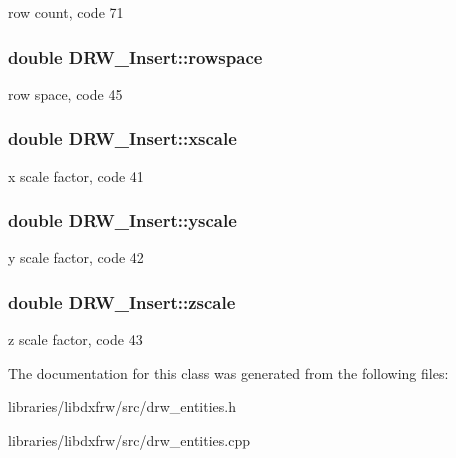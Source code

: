 row count, code 71 \hypertarget{classDRW__Insert_af9dde2e71b5fc348b0018c0e5c74d9cf}{
\subsubsection[{rowspace}]{\setlength{\rightskip}{0pt plus 5cm}double D\-R\-W\-\_\-\-Insert\-::rowspace}}\label{classDRW__Insert_af9dde2e71b5fc348b0018c0e5c74d9cf}
row space, code 45 \hypertarget{classDRW__Insert_a7b9b914c2570967914074f374ddbe9ef}{
\subsubsection[{xscale}]{\setlength{\rightskip}{0pt plus 5cm}double D\-R\-W\-\_\-\-Insert\-::xscale}}\label{classDRW__Insert_a7b9b914c2570967914074f374ddbe9ef}
x scale factor, code 41 \hypertarget{classDRW__Insert_a412f380485be38075b05976337102a47}{
\subsubsection[{yscale}]{\setlength{\rightskip}{0pt plus 5cm}double D\-R\-W\-\_\-\-Insert\-::yscale}}\label{classDRW__Insert_a412f380485be38075b05976337102a47}
y scale factor, code 42 \hypertarget{classDRW__Insert_a0f1cd0ef6b837894679b1135ce4bb132}{
\subsubsection[{zscale}]{\setlength{\rightskip}{0pt plus 5cm}double D\-R\-W\-\_\-\-Insert\-::zscale}}\label{classDRW__Insert_a0f1cd0ef6b837894679b1135ce4bb132}
z scale factor, code 43 

The documentation for this class was generated from the following files\-:\begin{DoxyCompactItemize}
\item 
libraries/libdxfrw/src/drw\-\_\-entities.\-h\item 
libraries/libdxfrw/src/drw\-\_\-entities.\-cpp\end{DoxyCompactItemize}

